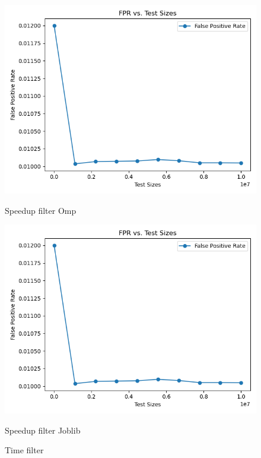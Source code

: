 \documentclass[11pt]{article}
\begin{document}
    \begin{figure}[H]
        \centering
        \includegraphics[width=\linewidth]{plot_filter_fpr}
            \caption{Speedup filter Omp}\label{fig:filter_fpr_omp}
        \endminipage\hfill
        \includegraphics[width=\linewidth]{plot_filter_fpr}
            \caption{Speedup filter Joblib}\label{fig:filter_fpr_joblib}
        \endminipage\hfill
        \caption{Time filter}
    \end{figure}
\end{document}
